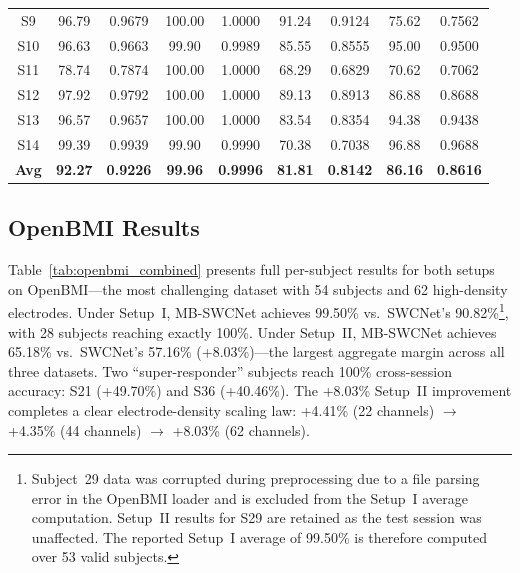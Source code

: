 \documentclass[conference]{IEEEtran}
\begin{document}
\begin{table}[t]
\begin{center}
\begin{tabular}{|c|cc|cc||cc|cc|}
S9  & 96.79 & 0.9679 & 100.00 & 1.0000 & 91.24 & 0.9124 & 75.62  & 0.7562 \\
S10 & 96.63 & 0.9663 & 99.90  & 0.9989 & 85.55 & 0.8555 & 95.00  & 0.9500 \\
S11 & 78.74 & 0.7874 & 100.00 & 1.0000 & 68.29 & 0.6829 & 70.62  & 0.7062 \\
S12 & 97.92 & 0.9792 & 100.00 & 1.0000 & 89.13 & 0.8913 & 86.88  & 0.8688 \\
S13 & 96.57 & 0.9657 & 100.00 & 1.0000 & 83.54 & 0.8354 & 94.38  & 0.9438 \\
S14 & 99.39 & 0.9939 & 99.90  & 0.9990 & 70.38 & 0.7038 & 96.88  & 0.9688 \\
\hline
\textbf{Avg} & \textbf{92.27} & \textbf{0.9226} & \textbf{99.96} & \textbf{0.9996} & \textbf{81.81} & \textbf{0.8142} & \textbf{86.16} & \textbf{0.8616} \\
\hline
\end{tabular}
\label{tab:hgd_combined}
\end{center}
\end{table}

\subsection{OpenBMI Results}

Table~\ref{tab:openbmi_combined} presents full per-subject results for both setups on OpenBMI---the most challenging dataset with 54 subjects and 62 high-density electrodes. Under Setup~I, MB-SWCNet achieves 99.50\% vs.\ SWCNet's 90.82\%\footnote{Subject~29 data was corrupted during preprocessing due to a file parsing error in the OpenBMI loader and is excluded from the Setup~I average computation. Setup~II results for S29 are retained as the test session was unaffected. The reported Setup~I average of 99.50\% is therefore computed over 53 valid subjects.}, with 28 subjects reaching exactly 100\%. Under Setup~II, MB-SWCNet achieves 65.18\% vs.\ SWCNet's 57.16\% (+8.03\%)---the largest aggregate margin across all three datasets. Two ``super-responder'' subjects reach 100\% cross-session accuracy: S21 (+49.70\%) and S36 (+40.46\%). The +8.03\% Setup~II improvement completes a clear electrode-density scaling law: +4.41\% (22 channels) $\rightarrow$ +4.35\% (44 channels) $\rightarrow$ +8.03\% (62 channels).
\end{document}
